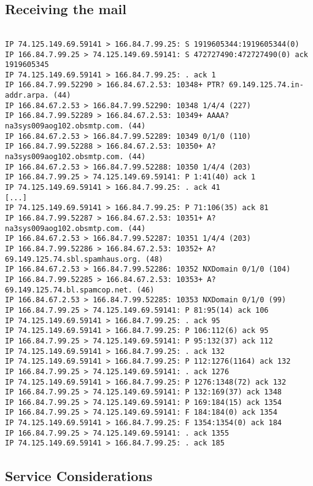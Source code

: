 \documentclass[xga]{xdvislides}
\begin{document}
\subsection{Receiving the mail}
\begin{verbatim}

IP 74.125.149.69.59141 > 166.84.7.99.25: S 1919605344:1919605344(0)
IP 166.84.7.99.25 > 74.125.149.69.59141: S 472727490:472727490(0) ack 1919605345
IP 74.125.149.69.59141 > 166.84.7.99.25: . ack 1
IP 166.84.7.99.52290 > 166.84.67.2.53: 10348+ PTR? 69.149.125.74.in-addr.arpa. (44)
IP 166.84.67.2.53 > 166.84.7.99.52290: 10348 1/4/4 (227)
IP 166.84.7.99.52289 > 166.84.67.2.53: 10349+ AAAA? na3sys009aog102.obsmtp.com. (44)
IP 166.84.67.2.53 > 166.84.7.99.52289: 10349 0/1/0 (110)
IP 166.84.7.99.52288 > 166.84.67.2.53: 10350+ A? na3sys009aog102.obsmtp.com. (44)
IP 166.84.67.2.53 > 166.84.7.99.52288: 10350 1/4/4 (203)
IP 166.84.7.99.25 > 74.125.149.69.59141: P 1:41(40) ack 1
IP 74.125.149.69.59141 > 166.84.7.99.25: . ack 41
[...]
IP 74.125.149.69.59141 > 166.84.7.99.25: P 71:106(35) ack 81
IP 166.84.7.99.52287 > 166.84.67.2.53: 10351+ A? na3sys009aog102.obsmtp.com. (44)
IP 166.84.67.2.53 > 166.84.7.99.52287: 10351 1/4/4 (203)
IP 166.84.7.99.52286 > 166.84.67.2.53: 10352+ A? 69.149.125.74.sbl.spamhaus.org. (48)
IP 166.84.67.2.53 > 166.84.7.99.52286: 10352 NXDomain 0/1/0 (104)
IP 166.84.7.99.52285 > 166.84.67.2.53: 10353+ A? 69.149.125.74.bl.spamcop.net. (46)
IP 166.84.67.2.53 > 166.84.7.99.52285: 10353 NXDomain 0/1/0 (99)
IP 166.84.7.99.25 > 74.125.149.69.59141: P 81:95(14) ack 106
IP 74.125.149.69.59141 > 166.84.7.99.25: . ack 95
IP 74.125.149.69.59141 > 166.84.7.99.25: P 106:112(6) ack 95
IP 166.84.7.99.25 > 74.125.149.69.59141: P 95:132(37) ack 112
IP 74.125.149.69.59141 > 166.84.7.99.25: . ack 132
IP 74.125.149.69.59141 > 166.84.7.99.25: P 112:1276(1164) ack 132
IP 166.84.7.99.25 > 74.125.149.69.59141: . ack 1276
IP 74.125.149.69.59141 > 166.84.7.99.25: P 1276:1348(72) ack 132
IP 166.84.7.99.25 > 74.125.149.69.59141: P 132:169(37) ack 1348
IP 166.84.7.99.25 > 74.125.149.69.59141: P 169:184(15) ack 1354
IP 166.84.7.99.25 > 74.125.149.69.59141: F 184:184(0) ack 1354
IP 74.125.149.69.59141 > 166.84.7.99.25: F 1354:1354(0) ack 184
IP 166.84.7.99.25 > 74.125.149.69.59141: . ack 1355
IP 74.125.149.69.59141 > 166.84.7.99.25: . ack 185
\end{verbatim}
\Normalsize

\subsection{Service Considerations}
\end{document}

